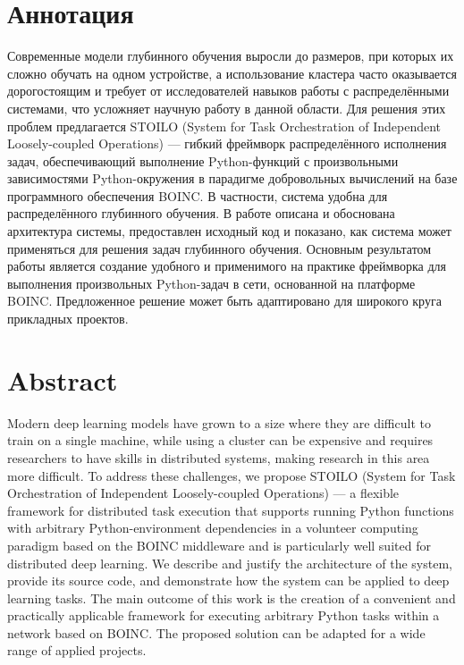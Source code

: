 \documentclass[a4paper,12pt]{extarticle}
\begin{document}

\clearpage
\setcounter{page}{2}

\section*{Аннотация}

Современные модели глубинного обучения выросли до размеров, при которых их сложно обучать на одном устройстве, а использование кластера часто оказывается дорогостоящим и требует от исследователей навыков работы с распределёнными системами, что усложняет научную работу в данной области.
Для решения этих проблем предлагается STOILO (System for Task Orchestration of Independent Loosely-coupled Operations) — гибкий фреймворк распределённого исполнения задач, обеспечивающий выполнение Python-функций с произвольными зависимостями Python-окружения в парадигме добровольных вычислений на базе программного обеспечения BOINC.
В частности, система удобна для распределённого глубинного обучения.
В работе описана и обоснована архитектура системы, предоставлен исходный код и показано, как система может применяться для решения задач глубинного обучения.
Основным результатом работы является создание удобного и применимого на практике фреймворка для выполнения произвольных Python-задач в сети, основанной на платформе BOINC.
Предложенное решение может быть адаптировано для широкого круга прикладных проектов.

\section*{Abstract}

Modern deep learning models have grown to a size where they are difficult to train on a single machine, while using a cluster can be expensive and requires researchers to have skills in distributed systems, making research in this area more difficult.
To address these challenges, we propose STOILO (System for Task Orchestration of Independent Loosely-coupled Operations) — a flexible framework for distributed task execution that supports running Python functions with arbitrary Python-environment dependencies in a volunteer computing paradigm based on the BOINC middleware and is particularly well suited for distributed deep learning.
We describe and justify the architecture of the system, provide its source code, and demonstrate how the system can be applied to deep learning tasks.
The main outcome of this work is the creation of a convenient and practically applicable framework for executing arbitrary Python tasks within a network based on BOINC.
The proposed solution can be adapted for a wide range of applied projects.
\end{document}
